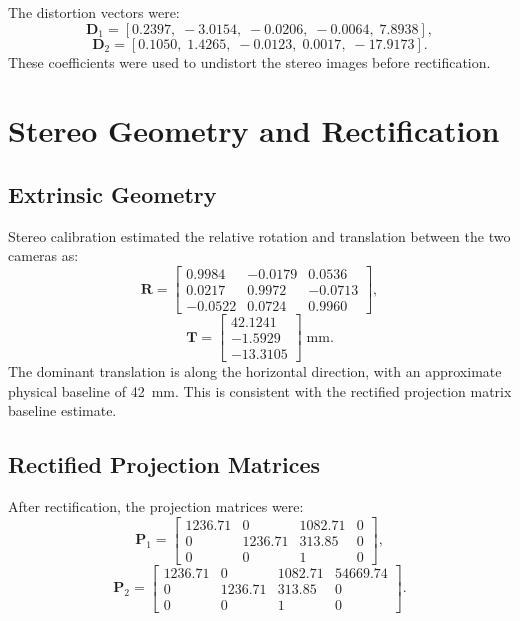 \documentclass[11pt,a4paper]{article}
\newcommand{\mat}[1]{\mathbf{#1}}
\begin{document}
The distortion vectors were:
\begin{equation}
\mat{D}_1=[0.2397,\;-3.0154,\;-0.0206,\;-0.0064,\;7.8938],
\end{equation}
\begin{equation}
\mat{D}_2=[0.1050,\;1.4265,\;-0.0123,\;0.0017,\;-17.9173].
\end{equation}
These coefficients were used to undistort the stereo images before rectification.

\section{Stereo Geometry and Rectification}

\subsection{Extrinsic Geometry}

Stereo calibration estimated the relative rotation and translation between the two cameras as:
\begin{equation}
\mat{R}=\begin{bmatrix}
0.9984 & -0.0179 & 0.0536 \\
0.0217 & 0.9972 & -0.0713 \\
-0.0522 & 0.0724 & 0.9960
\end{bmatrix},
\end{equation}
\begin{equation}
\mat{T}=\begin{bmatrix}
42.1241\\
-1.5929\\
-13.3105
\end{bmatrix}\;\text{mm}.
\end{equation}
The dominant translation is along the horizontal direction, with an approximate physical baseline of \SI{42}{mm}. This is consistent with the rectified projection matrix baseline estimate.

\subsection{Rectified Projection Matrices}

After rectification, the projection matrices were:
\begin{equation}
\mat{P}_1=\begin{bmatrix}
1236.71 & 0 & 1082.71 & 0 \\
0 & 1236.71 & 313.85 & 0 \\
0 & 0 & 1 & 0
\end{bmatrix},
\end{equation}
\begin{equation}
\mat{P}_2=\begin{bmatrix}
1236.71 & 0 & 1082.71 & 54669.74 \\
0 & 1236.71 & 313.85 & 0 \\
0 & 0 & 1 & 0
\end{bmatrix}.
\end{equation}
\end{document}
